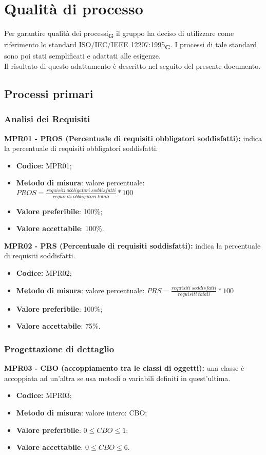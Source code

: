\section{Qualità di processo}
Per garantire qualità dei processi\textsubscript{\textbf{G}} il gruppo ha deciso di utilizzare come riferimento lo standard ISO/IEC/IEEE 12207:1995\textsubscript{\textbf{G}}.
I processi di tale standard sono poi stati semplificati e adattati alle esigenze.\\Il risultato di questo adattamento è descritto nel seguito del presente documento.
\subsection{Processi primari}
\subsubsection{Analisi dei Requisiti}
\textbf{MPR01 - PROS (Percentuale di requisiti obbligatori soddisfatti):} indica la percentuale di requisiti obbligatori soddisfatti.
\begin{itemize}
    \item \textbf{Codice:} MPR01;
    \item \textbf{Metodo di misura}: valore percentuale: $PROS = \frac{requisiti \ obbligatori \ soddisfatti}{requisiti \ obbligatori \ totali} * 100$
    \item \textbf{Valore preferibile}: 100\%;
    \item \textbf{Valore accettabile}: 100\%.
\end{itemize}
\textbf{MPR02 - PRS (Percentuale di requisiti soddisfatti):} indica la percentuale di requisiti soddisfatti.
\begin{itemize}
    \item \textbf{Codice:} MPR02;
    \item \textbf{Metodo di misura}: valore percentuale: $PRS = \frac{requisiti \ soddisfatti}{requisiti \ totali} * 100$
    \item \textbf{Valore preferibile}: 100\%;
    \item \textbf{Valore accettabile}: 75\%.
\end{itemize}
\subsubsection{Progettazione di dettaglio}
\textbf{MPR03 - CBO (accoppiamento tra le classi di oggetti):} una classe è accoppiata ad un'altra se usa metodi o variabili definiti in quest'ultima.
\begin{itemize}
    \item \textbf{Codice:} MPR03;
    \item \textbf{Metodo di misura}: valore intero: CBO;
    \item \textbf{Valore preferibile}: $0 \leq CBO \leq 1$;
    \item \textbf{Valore accettabile}: $0 \leq CBO \leq 6$.
\end{itemize}
